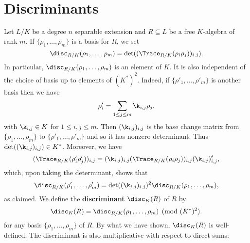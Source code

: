   \section{Discriminants}
    Let $L/K$ be a degree $n$ separable extension and $R \subseteq L$ be a free $K$-algebra of rank $m$. If $\{\rho_{1},\ldots,\rho_{m}\}$ is a basis for $R$, we set
    \[
      \disc_{R/K}(\rho_{1},\ldots,\rho_{m}) = \det((\Trace_{R/K}(\rho_{i}\rho_{j}))_{i,j}).
    \]
    In particular, $\disc_{R/K}(\rho_{1},\ldots,\rho_{m})$ is an element of $K$. It is also independent of the choice of basis up to elements of $(K^{\ast})^{2}$. Indeed, if $\{\rho'_{1},\ldots,\rho'_{m}\}$ is another basis then we have
    \[
      \rho'_{i} = \sum_{1 \le j \le m}\k_{i,j}\rho_{j},
    \]
    with $\k_{i,j} \in K$ for $1 \le i,j \le m$. Then $(\k_{i,j})_{i,j}$ is the base change matrix from $\{\rho_{1},\ldots,\rho_{m}\}$ to $\{\rho'_{1},\ldots,\rho'_{m}\}$ and so it has nonzero determinant. Thus $\det((\k_{i,j})_{i,j}) \in K^{\ast}$. Moreover, we have
    \[
      (\Trace_{R/K}(\rho'_{i}\rho'_{j}))_{i,j} = (\k_{i,j})_{i,j}(\Trace_{R/K}(\rho_{i}\rho_{j}))_{i,j}(\k_{i,j})_{i,j}^{t},
    \]
    which, upon taking the determinant, shows that
    \begin{equation}\label{equ:discriminant_base_change}
      \disc_{R/K}(\rho'_{1},\ldots,\rho'_{m}) = \det((\k_{i,j})_{i,j})^{2}\disc_{R/K}(\rho_{1},\ldots,\rho_{m}),
    \end{equation}
    as claimed. We define the \textbf{discriminant} $\disc_{K}(R)$ of $R$ by
    \[
      \disc_{K}(R) = \disc_{R/K}(\rho_{1},\ldots,\rho_{m}) \pmod{(K^{\ast})^{2}}.
    \]
    for any basis $\{\rho_{1},\ldots,\rho_{m}\}$ of $R$. By what we have shown, $\disc_{K}(R)$ is well-defined. The discriminant is also multiplicative with respect to direct sums:

